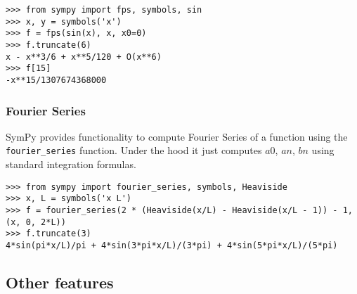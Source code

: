 \begin{verbatim}
>>> from sympy import fps, symbols, sin
>>> x, y = symbols('x')
>>> f = fps(sin(x), x, x0=0)
>>> f.truncate(6)
x - x**3/6 + x**5/120 + O(x**6)
>>> f[15]
-x**15/1307674368000
\end{verbatim}

\subsubsection{Fourier Series}

SymPy provides functionality to compute Fourier Series of a function using
the \texttt{fourier_series} function. Under the hood it just computes $a0$, $an$, $bn$ using
standard integration formulas.

\begin{verbatim}
>>> from sympy import fourier_series, symbols, Heaviside
>>> x, L = symbols('x L')
>>> f = fourier_series(2 * (Heaviside(x/L) - Heaviside(x/L - 1)) - 1, (x, 0, 2*L))
>>> f.truncate(3)
4*sin(pi*x/L)/pi + 4*sin(3*pi*x/L)/(3*pi) + 4*sin(5*pi*x/L)/(5*pi)
\end{verbatim}


\subsection{Other features}
